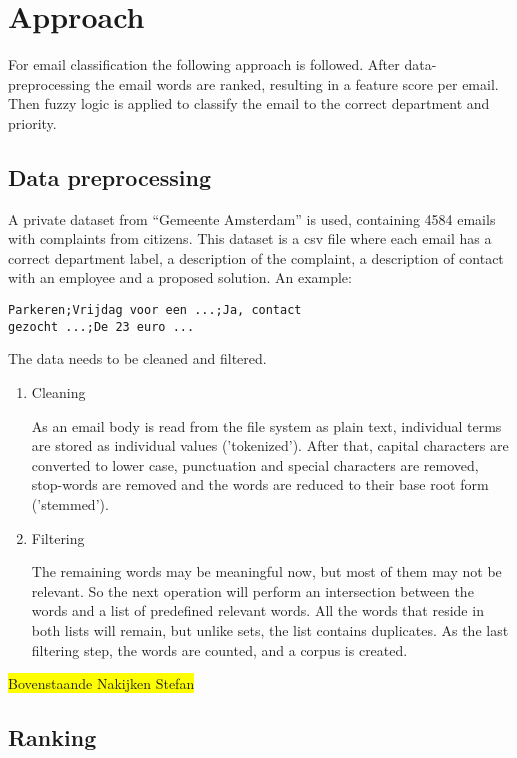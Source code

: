 \documentclass[journal]{IEEEtran}
\begin{document}
\section{Approach}
For email classification the following approach is followed. After data-preprocessing the email words are ranked, resulting in a feature score per email. Then fuzzy logic is applied to classify the email to the correct department and priority. 

\subsection{Data preprocessing}
A private dataset from ``Gemeente Amsterdam'' is used, containing 4584 emails with complaints from citizens. 
This dataset is a csv file where each email has a correct department label, a description of the complaint, a description of contact with an employee and a proposed solution.
An example:
\begin{lstlisting}
Parkeren;Vrijdag voor een ...;Ja, contact 
gezocht ...;De 23 euro ...
\end{lstlisting}

The data needs to be cleaned and filtered.

\begin{enumerate}
    \item Cleaning

    As an email body is read from the file system as plain text, individual terms are stored as individual values ('tokenized'). After that, capital characters are converted to lower case, punctuation and special characters are removed, stop-words are removed and the words are reduced to their base root form ('stemmed'). 

    \item Filtering

    The remaining words may be meaningful now, but most of them may not be 
    relevant. So the next operation will perform an intersection between the 
    words and a list of predefined relevant words. All the words that reside 
    in both lists will remain, but unlike sets, the list contains duplicates.
    As the last filtering step, the words are counted, and a corpus is created.

\end{enumerate}
\colorbox{yellow}{Bovenstaande Nakijken Stefan}
\subsection{Ranking}
\end{document}
